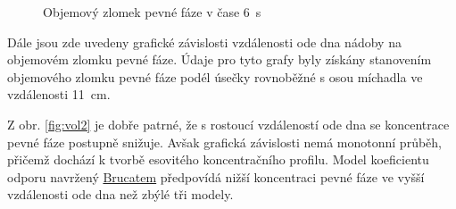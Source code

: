 \begin{figure}[h!]
\begin{center}
  \qquad
  \caption{Objemový zlomek pevné fáze v čase \SI{6}{\second}}
  \label{fig:count6}
  \end{center}
\end{figure}

\vspace{-9mm}

Dále jsou zde uvedeny grafické závislosti vzdálenosti ode dna nádoby na objemovém zlomku pevné fáze. Údaje pro tyto grafy byly získány stanovením objemového zlomku pevné fáze podél úsečky rovnoběžné s osou míchadla ve vzdálenosti \SI{11}{\centi\metre}.

Z obr. \ref{fig:vol2} je dobře patrné, že s rostoucí vzdáleností ode dna se koncentrace pevné fáze postupně snižuje. Avšak grafická závislosti nemá monotonní průběh, přičemž dochází k tvorbě esovitého koncentračního profilu. Model koeficientu odporu navržený \hyperlink{hyp:cds}{Brucatem} předpovídá nižší koncentraci pevné fáze ve vyšší vzdálenosti ode dna než zbýlé tři modely.     

\newpage

